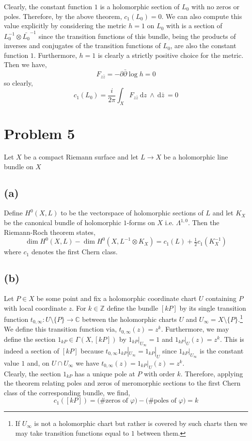 \documentclass[12pt]{extarticle}
\newcommand{\Z}{\mathbb{Z}}
\newcommand{\C}{\mathbb{C}}
\renewcommand{\d}[1]{\: \mathrm{d}#1 \:}
\theoremstyle{definition}
\begin{document}
Clearly, the constant function $1$ is a holomorphic section of $L_0$ with no zeros or poles. Therefore, by the above theorem, $c_1(L_0) = 0$. We can also compute this value explicitly by considering the metric $h = 1$ on $L_0$ with is a section of $L_0^{-1} \otimes \bar{L_0}^{-1}$ since the transition functions of this bundle, being the products of inverses and conjugates of the transition functions of $L_0$, are also the constant function $1$. Furthermore, $h = 1$ is clearly a strictly positive choice for the metric. Then we have,
\[ F_{z \bar{z}} = - \partial \bar{\partial} \log{h} = 0 \]
so clearly,
\[ c_1(L_0) = \frac{i}{2 \pi} \int_X F_{z \bar{z}} \d{z} \wedge \d{\bar{z}} = 0 \]

\section*{Problem 5}

Let $X$ be a compact Riemann surface and let $L \to X$ be a holomorphic line bundle on $X$

\subsection*{(a)}

Define $H^0(X, L)$ to be the vectorspace of holomorphic sections of $L$ and let $K_X$ be the canonical bundle of holomorphic $1$-forms on $X$ i.e. $\Lambda^{1,0}$. Then the Riemann-Roch theorem states,
\[ \dim{H^0(X, L)} - \dim{H^0(X, L^{-1} \otimes K_X)} = c_1(L) + \tfrac{1}{2} c_1(K_X^{-1}) \]
where $c_1$ denotes the first Chern class.  

\subsection*{(b)}

Let $P \in X$ be some point and fix a holomorphic coordinate chart $U$ containing $P$ with local coordinate $z$. For $k \in \Z$ define the bundle $[k P]$ by its single transition function $t_{0, \infty} : U \setminus \{P\} \to \C$ between the holomorphic charts $U$ and $U_{\infty} = X \setminus \{P\}$.\footnote{If $U_{\infty}$ is not a holomorphic chart but rather is covered by such charts then we may take transition functions equal to $1$ between them. } We define this transition function via, $t_{0,\infty}(z) = z^k$. Furthermore, we may define the section $1_{kP} \in \Gamma(X, [kP])$ by $1_{kP} |_{U_{\infty}} = 1$ and $1_{kP} |_{U}(z) = z^k$. This is indeed a section of $[kP]$ because $t_{0, \infty} 1_{kP}|_{U_{\infty}} = 1_{kP} |_{U}$ since $1_{kP}|_{U_{\infty}}$ is the constant value $1$ and, on $U \cap U_{\infty}$ we have $t_{0, \infty}(z) = 1_{kP} |_{U}(z) = z^k$. 
\bigskip\\
Clearly, the section $1_{kP}$ has a unique pole at $P$ with order $k$. Therefore, applying the theorem relating poles and zeros of meromorphic sections to the first Chern class of the corresponding bundle, we find,
\[ c_1([kP]) = \text{(\# zeros of $\varphi$)} - \text{(\# poles of $\varphi$)} = k \]
\end{document}
